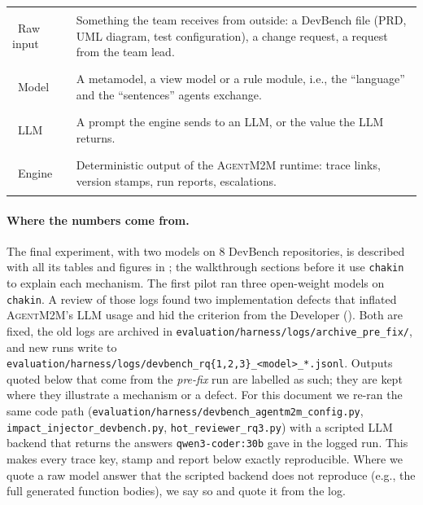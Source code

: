 \documentclass[10pt,a4paper]{article}
\newcommand{\tool}{\textsc{AgentM2M}}
\newcommand{\file}[1]{\texttt{#1}}
\theoremstyle{definition}
\begin{document}
\begin{center}
\small
\begin{tabular}{@{}l p{11.5cm}@{}}
\toprule
\colorbox{rawbg}{\strut\ Raw input\ } & Something the team receives from outside: a DevBench file (PRD, UML diagram, test configuration), a change request, a request from the team lead. \\
\colorbox{modelbg}{\strut\ Model\ } & A metamodel, a view model or a rule module, i.e., the ``language'' and the ``sentences'' agents exchange. \\
\colorbox{llmbg}{\strut\ LLM\ } & A prompt the engine sends to an LLM, or the value the LLM returns. \\
\colorbox{enginebg}{\strut\ Engine\ } & Deterministic output of the \tool{} runtime: trace links, version stamps, run reports, escalations. \\
\bottomrule
\end{tabular}
\end{center}

\paragraph{Where the numbers come from.} The final experiment, with two
models on 8 DevBench repositories, is described with all its tables and
figures in ; the walkthrough sections before it use
\texttt{chakin} to explain each mechanism. The first pilot ran three
open-weight models on \texttt{chakin}. A review of those logs found two
implementation defects that inflated \tool{}'s LLM usage and hid the
criterion from the Developer (). Both are fixed, the old
logs are archived in \file{evaluation/harness/logs/archive\_pre\_fix/}, and
new runs write to \file{evaluation/harness/logs/devbench\_rq\{1,2,3\}\_<model>\_*.jsonl}.
Outputs quoted below that come from the \emph{pre-fix} run are labelled as
such; they are kept where they illustrate a mechanism or a defect. For this
document we re-ran the same code path
(\file{evaluation/harness/devbench_agentm2m_config.py},
\file{impact_injector_devbench.py}, \file{hot_reviewer_rq3.py}) with a scripted
LLM backend that returns the answers \texttt{qwen3-coder:30b} gave in the
logged run. This makes every trace key, stamp and report below exactly
reproducible. Where we quote a raw model answer that the scripted backend does
not reproduce (e.g., the full generated function bodies), we say so and quote
it from the log.
\end{document}
